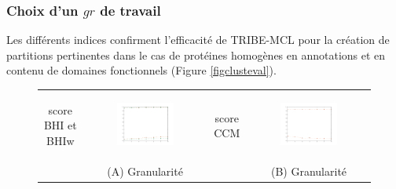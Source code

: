     
\subsubsection{Choix d'un $gr$ de travail}
	Les différents indices confirment l'efficacité de TRIBE-MCL pour la création de partitions pertinentes dans le cas de protéines homogènes en annotations et en contenu de domaines fonctionnels (Figure \ref{figclusteval}). 
	
\begin{figure}[H]
	\begin{center}
	\begin{tabular}{@{\hspace{-1.5cm}}cccc}
	\begin{turn}{90}\scriptsize\hspace{1.5cm} score BHI et BHIw \end{turn}&\includegraphics[width=0.50\textwidth, trim=15mm 10mm 9mm 0mm ,clip]{./img/clusteval1.png}&\begin{turn}{90}\scriptsize\hspace{1.5cm} score CCM \end{turn}&\includegraphics[width=0.50\textwidth, trim=15mm 10mm 9mm 0mm ,clip]{./img/clusteval2.png} \\
	&\scriptsize (A) Granularité&&\scriptsize (B) Granularité\\
	\end{tabular}
	\begin{tabular}{ccc}

\end{tabular}
\end{center}
\end{figure}
